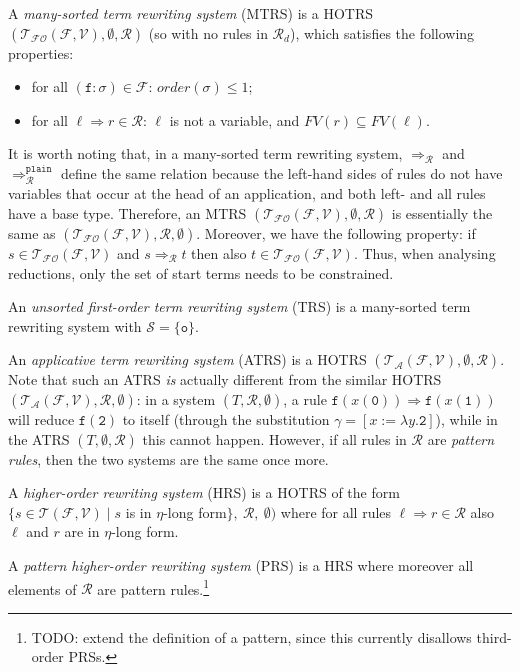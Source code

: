 \documentclass{lmcs}
\theoremstyle{theorem}\newtheorem{theorem}{Theorem}
\theoremstyle{theorem}\newtheorem{lemma}[theorem]{Lemma}
\theoremstyle{theorem}\newtheorem{corollary}[theorem]{Corollary}
\theoremstyle{definition}\newtheorem{definition}[theorem]{Definition}
\theoremstyle{definition}\newtheorem{example}[theorem]{Example}
\newcommand{\F}{\mathcal{F}}
\newcommand{\V}{\mathcal{V}}
\newcommand{\Sorts}{\mathcal{S}}
\newcommand{\Terms}{\mathcal{T}}
\newcommand{\ATerms}{\mathcal{T}_{\mathcal{A}}}
\newcommand{\FOTerms}{\mathcal{T}_{\mathcal{FO}}}
\newcommand{\Rules}{\mathcal{R}}
\newcommand{\FV}{\mathit{FV}}
\newcommand{\order}{\mathit{order}}
\newcommand{\atype}{\sigma}
\newcommand{\identifier}[1]{\mathtt{#1}}
\newcommand{\afun}{\identifier{f}}
\newcommand{\avar}{x}
\newcommand{\bvar}{y}
\newcommand{\abs}[2]{\lambda #1.#2}
\newcommand{\arrz}{\Rightarrow}
\newcommand{\arr}[1]{\arrz_{#1}}
\newcommand{\symb}[1]{\mathtt{#1}}
\newcommand{\nul}{\symb{0}}
\newcommand{\unitsort}{\mathtt{o}}
\begin{document}
A \emph{many-sorted term rewriting system} (MTRS) is a HOTRS $(\FOTerms(\F,\V), \emptyset,
\Rules)$ (so with no rules in $\Rules_d$), which satisfies the following properties:
\begin{itemize}
\item for all $(\afun : \atype) \in \F$: $\order(\atype) \leq 1$;
\item for all $\ell \arrz r \in \Rules$: $\ell$ is not a variable, and $\FV(r) \subseteq \FV(\ell)$.
\end{itemize}
It is worth noting that, in a many-sorted term rewriting system, $\arr{\Rules}$ and
$\arr{\Rules}^{\mathtt{plain}}$ define the same relation because the left-hand sides of rules do
not have variables that occur at the head of an application, and both left- and all rules have
a base type. Therefore, an MTRS $(\FOTerms(\F,\V),\emptyset,\Rules)$ is essentially the same as
$(\FOTerms(\F,\V),\Rules,\emptyset)$.
Moreover, we have the following property: if $s \in \FOTerms(\F,\V)$ and $s \arr{\Rules} t$
then also $t \in \FOTerms(\F,\V)$. Thus, when analysing reductions, only the set of start terms
needs to be constrained.

An \emph{unsorted first-order term rewriting system} (TRS) is a many-sorted term rewriting system
with $\Sorts = \{ \unitsort \}$.

An \emph{applicative term rewriting system} (ATRS) is a HOTRS $(\ATerms(\F,\V),\emptyset,\Rules)$.
Note that such an ATRS \emph{is} actually different from the similar HOTRS
$(\ATerms(\F,\V),\Rules,\emptyset)$: in a system $(T,\Rules,\emptyset)$, a rule
$\afun(\avar(\nul)) \arrz \afun(\avar(\symb{1}))$ will reduce $\afun(\symb{2})$ to itself
(through the substitution $\gamma = [\avar:=\abs{\bvar}{\symb{2}}]$), while in the ATRS
$(T,\emptyset,\Rules)$ this cannot happen.  However, if all rules in $\Rules$ are
\emph{pattern rules}, then the two systems are the same once more.

A \emph{higher-order rewriting system} (HRS) is a HOTRS of the form
$\{ s \in \Terms(\F,\V) \mid s$ is in $\eta$-long form$\},\ \Rules,\ \emptyset)$ where for all
rules $\ell \arrz r \in \Rules$ also $\ell$ and $r$ are in $\eta$-long form.

A \emph{pattern higher-order rewriting system} (PRS) is a HRS where moreover all elements of
$\Rules$ are pattern rules.\footnote{TODO: extend the definition of a pattern, since this
currently disallows third-order PRSs.}
\end{document}
